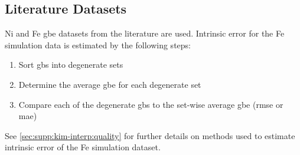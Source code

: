 \documentclass[final,twocolumn,12pt]{elsarticle}
\begin{document}
	\subsection{Literature Datasets}
	\label{sec:methods:litdata}
	Ni \cite{olmstedSurveyComputedGrain2009} and Fe \cite{kimPhasefieldModeling3D2014} \gls{gbe} datasets from the literature are used. Intrinsic error for the Fe simulation data is estimated by the following steps:
	\begin{enumerate}
	    \item Sort \glspl{gb} into degenerate sets
	    \item Determine the average \gls{gbe} for each degenerate set
	    \item Compare each of the degenerate \glspl{gb} to the set-wise average \gls{gbe} (\gls{rmse} or \gls{mae})
	\end{enumerate}
	See \cref{sec:supp:kim-interp:quality} for further details on methods used to estimate intrinsic error of the Fe simulation dataset.
	
\end{document}
